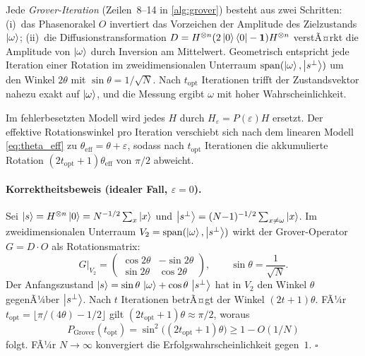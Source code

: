 ﻿\documentclass[11pt,a4paper]{article}
\theoremstyle{definition}
\newcommand{\eps}{\varepsilon}
\begin{document}
Jede \emph{Grover-Iteration} (Zeilen~8--14 in \cref{alg:grover}) besteht aus
zwei Schritten: (i)~das Phasenorakel $O$ invertiert das Vorzeichen der
Amplitude des Zielzustands $\ket{\omega}$; (ii)~die
Diffusionstransformation $D = H^{\otimes n}(2\ket{0}\bra{0}-\mathbf{1})H^{\otimes n}$
verstÃ¤rkt die Amplitude von $\ket{\omega}$ durch Inversion am Mittelwert.
Geometrisch entspricht jede Iteration einer Rotation im zweidimensionalen
Unterraum $\mathrm{span}(\ket{\omega},\ket{s^\perp})$ um den Winkel $2\theta$
mit $\sin\theta = 1/\sqrt{N}$.  Nach $t_{\mathrm{opt}}$ Iterationen trifft
der Zustandsvektor nahezu exakt auf $\ket{\omega}$, und die Messung ergibt
$\omega$ mit hoher Wahrscheinlichkeit.

Im fehlerbesetzten Modell wird jedes $H$ durch $H_\varepsilon = P(\varepsilon)H$
ersetzt.  Der effektive Rotationswinkel pro Iteration verschiebt sich nach
dem linearen Modell \eqref{eq:theta_eff} zu $\theta_{\mathrm{eff}}=\theta+\eps$,
sodass nach $t_{\mathrm{opt}}$ Iterationen die akkumulierte Rotation
$(2t_{\mathrm{opt}}+1)\theta_{\mathrm{eff}}$ von $\pi/2$ abweicht.

\paragraph{Korrektheitsbeweis (idealer Fall, $\varepsilon=0$).}
Sei $\ket{s}=H^{\otimes n}\ket{0}=N^{-1/2}\sum_{x}\ket{x}$ und
$\ket{s^\perp}=(N{-}1)^{-1/2}\sum_{x\neq\omega}\ket{x}$.  Im
zweidimensionalen Unterraum $V_2=\mathrm{span}(\ket{\omega},\ket{s^\perp})$
wirkt der Grover-Operator $G=D\cdot O$ als Rotationsmatrix:
\[
  G\big|_{V_2} = \begin{pmatrix}\cos 2\theta & -\sin 2\theta \\ \sin 2\theta & \cos 2\theta\end{pmatrix},
  \qquad \sin\theta = \frac{1}{\sqrt{N}}.
\]
Der Anfangszustand $\ket{s} = \sin\theta\,\ket{\omega}+\cos\theta\,\ket{s^\perp}$
hat in $V_2$ den Winkel $\theta$ gegenÃ¼ber $\ket{s^\perp}$.  Nach $t$
Iterationen betrÃ¤gt der Winkel $(2t+1)\theta$.  FÃ¼r
$t_{\mathrm{opt}}=\lfloor\pi/(4\theta)-1/2\rfloor$ gilt
$(2t_{\mathrm{opt}}+1)\theta \approx \pi/2$, woraus
\[
  P_{\mathrm{Grover}}(t_{\mathrm{opt}})
  = \sin^2\!\bigl((2t_{\mathrm{opt}}+1)\theta\bigr) \geq 1 - O(1/N)
\]
folgt.  FÃ¼r $N\to\infty$ konvergiert die Erfolgswahrscheinlichkeit
gegen~$1$.  $\square$
\end{document}
